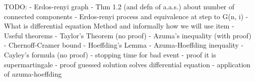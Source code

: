 

TODO:
- Erdos-renyi graph
- Thm 1.2 (and defn of a.a.s.) about number of connected components
- Erdos-renyi process and equivalence at step to G(n, i)
- What is differential equation Method and informally how we will use item
- Useful theorems
    - Taylor's Theorem (no proof)
    - Azuma's inequality (with proof)
        - Chernoff-Cramer bound
        - Hoeffding's Lemma
        - Azuma-Hoeffding inequality
    - Cayley's formula (no proof)
- stopping time for bad event
- proof it is supermartingale
- proof guessed solution solves differential equation
- application of azuma-hoeffding
